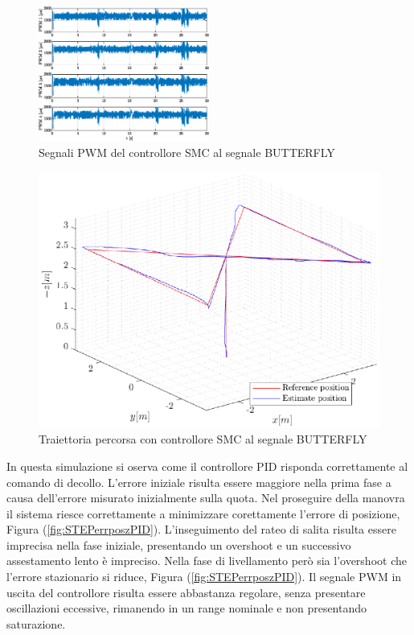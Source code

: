 \begin{figure}
	\centering
	\includegraphics[width=0.5\textwidth]{Simulazioni/Figure/SMC/BUTTERFLY/PWM}
	\caption{Segnali PWM del controllore SMC al segnale BUTTERFLY}
\end{figure}
\begin{figure}
	\centering
	\includegraphics[width=1\textwidth]{Simulazioni/Figure/SMC/BUTTERFLY/Trajectory}
	\caption{Traiettoria percorsa con controllore SMC al segnale BUTTERFLY}
\end{figure}

In questa simulazione si oserva come il controllore PID risponda correttamente al comando di decollo. L'errore iniziale risulta essere maggiore nella prima fase a causa dell'errore misurato inizialmente sulla quota. Nel proseguire della manovra il sistema riesce correttamente a minimizzare corettamente l'errore di posizione, Figura (\ref{fig:STEPerrposzPID}). L'inseguimento del rateo di salita risulta essere imprecisa nella fase iniziale, presentando un overshoot e un successivo assestamento lento è impreciso. Nella fase di livellamento però sia l'overshoot che l'errore stazionario si riduce, Figura (\ref{fig:STEPerrposzPID}). Il segnale PWM in uscita del controllore risulta essere abbastanza regolare, senza presentare oscillazioni eccessive, rimanendo in un range nominale e non presentando saturazione.

